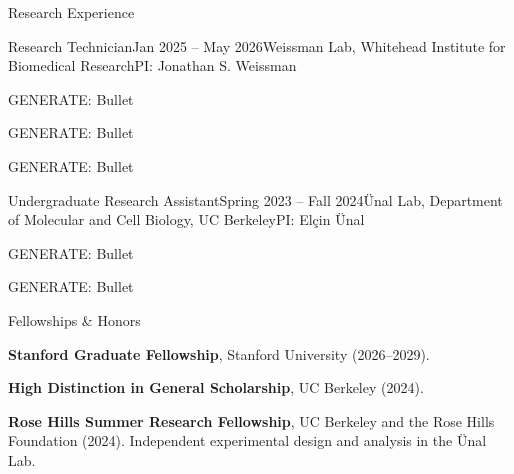 \documentclass[letterpaper]{cv} %
\begin{document}

\begin{rSection}{Research Experience}

\begin{rSubsection}{Research Technician}{Jan 2025 -- May 2026}{Weissman Lab, Whitehead Institute for Biomedical Research}{PI: Jonathan S. Weissman}

\item [GENERATE: Bullet]
\item [GENERATE: Bullet]
\item [GENERATE: Bullet]

\end{rSubsection}

\begin{rSubsection}{Undergraduate Research Assistant}{Spring 2023 -- Fall 2024}{\"{U}nal Lab, Department of Molecular and Cell Biology, UC Berkeley}{PI: El\c{c}in \"{U}nal}

\item [GENERATE: Bullet]
\item [GENERATE: Bullet]

\end{rSubsection}

\end{rSection}


\begin{rSection2}{Fellowships \& Honors}
\item \textbf{Stanford Graduate Fellowship}, Stanford University (2026--2029).
\item \textbf{High Distinction in General Scholarship}, UC Berkeley (2024).
\item \textbf{Rose Hills Summer Research Fellowship}, UC Berkeley and the Rose Hills Foundation (2024). Independent experimental design and analysis in the \"{U}nal Lab.
\end{rSection2}
\end{document}

